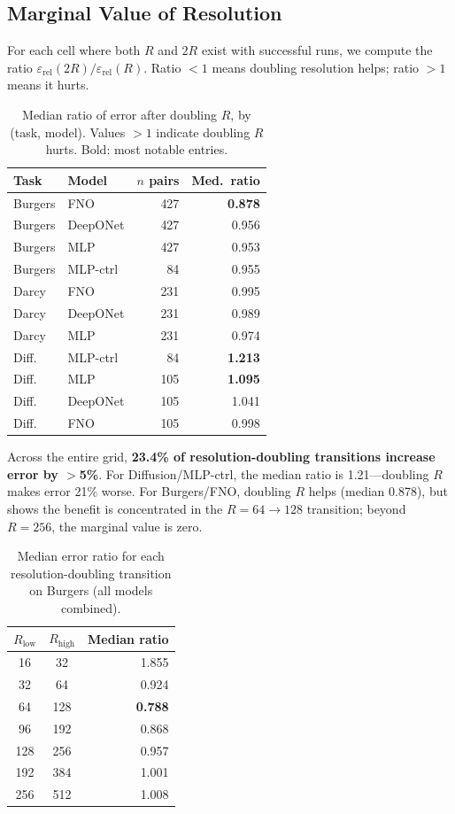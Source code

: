 \documentclass[11pt]{article}
\newcommand{\relLtwo}{\varepsilon_{\mathrm{rel}}}
\begin{document}
\subsection{Marginal Value of Resolution}
\label{sec:marginal-R}

For each cell where both $R$ and $2R$ exist with successful runs,
we compute the ratio $\relLtwo(2R) / \relLtwo(R)$. Ratio $< 1$
means doubling resolution helps; ratio $> 1$ means it hurts.

\begin{table}[h]
\centering
\caption{Median ratio of error after doubling $R$, by (task, model).
Values $>1$ indicate doubling $R$ hurts. Bold: most notable entries.}
\label{tab:marginal-R}
\begin{tabular}{@{}llrr@{}}
\toprule
\textbf{Task} & \textbf{Model} & \textbf{$n$ pairs} &
\textbf{Med.\ ratio} \\
\midrule
Burgers & FNO        & 427 & \textbf{0.878} \\
Burgers & DeepONet   & 427 & 0.956 \\
Burgers & MLP        & 427 & 0.953 \\
Burgers & MLP-ctrl   &  84 & 0.955 \\
Darcy   & FNO        & 231 & 0.995 \\
Darcy   & DeepONet   & 231 & 0.989 \\
Darcy   & MLP        & 231 & 0.974 \\
Diff.   & MLP-ctrl   &  84 & \textbf{1.213} \\
Diff.   & MLP        & 105 & \textbf{1.095} \\
Diff.   & DeepONet   & 105 & 1.041 \\
Diff.   & FNO        & 105 & 0.998 \\
\bottomrule
\end{tabular}
\end{table}

\noindent
Across the entire grid, \textbf{23.4\% of resolution-doubling
transitions increase error by $>$5\%}. For Diffusion/MLP-ctrl,
the median ratio is 1.21---doubling $R$ makes error 21\% worse.
For Burgers/FNO, doubling $R$ helps (median 0.878), but
 shows the benefit is concentrated
in the $R{=}64 \to 128$ transition; beyond $R{=}256$, the marginal
value is zero.

\begin{table}[h]
\centering
\caption{Median error ratio for each resolution-doubling transition
on Burgers (all models combined).}
\label{tab:burgers-transitions}
\begin{tabular}{@{}ccr@{}}
\toprule
$R_{\text{low}}$ & $R_{\text{high}}$ & Median ratio \\
\midrule
16  & 32  & 1.855 \\
32  & 64  & 0.924 \\
64  & 128 & \textbf{0.788} \\
96  & 192 & 0.868 \\
128 & 256 & 0.957 \\
192 & 384 & 1.001 \\
256 & 512 & 1.008 \\
\bottomrule
\end{tabular}
\end{table}
\end{document}
